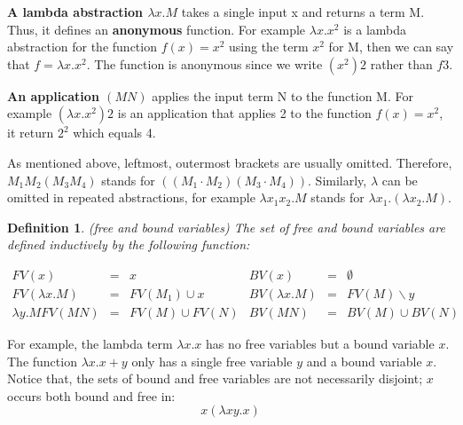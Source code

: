 \documentclass[a4paper,11pt,twoside]{report}
\newtheorem{def1}{\textbf{Definition}}[chapter]
\begin{document}
\textbf{A lambda abstraction $\lambda x.M$} takes a single input x and returns a term M. Thus, it defines an \textbf{anonymous} function. For example $\lambda x.x^2$ is a lambda abstraction for the function $f(x) = x^2$ using the term $x^2$ for M, then we can say that $f = \lambda x.x^2$. The function is anonymous since we write $(x^2)2$ rather than $f3$.

\textbf{An application $(MN)$} applies the input term N to the function M. For example $(\lambda x.x^2)2$ is an application that applies 2 to the function $f(x) = x^2$, it return $2^2$ which equals 4.

As mentioned above, leftmost, outermost brackets are usually omitted. Therefore, $M_1M_2(M_3M_4)$ stands for $((M_1\cdot M_2)(M_3\cdot M_4))$. Similarly, $\lambda$ can be omitted in repeated abstractions, for example $\lambda x_1x_2.M$ stands for $\lambda x_1.(\lambda x_2.M)$.

\begin{def1}
\normalfont (free and bound variables) The set of free and bound variables are defined inductively by the following function:
\end{def1}

\begin{equation*}
\begin{array}{lcllcl}
FV(x)           & = & {x}             & BV(x)           &=& \emptyset\\
FV(\lambda x.M) & = & FV(M_1)\cup {x} & BV(\lambda x.M) &=& FV(M)\backslash y\\  \lambda y.M
FV(MN)          & = & FV(M)\cup FV(N) & BV(MN)          &=& BV(M) \cup BV(N)
\end{array}
\end{equation*}


For example, the lambda term $\lambda x.x$ has no free variables but a bound variable $x$. The function $\lambda x.x+y$ only has a single free variable $y$ and a bound variable $x$. 
Notice that, the sets of bound and free variables are not necessarily disjoint; $x$ occurs both bound and free in:
\begin{equation*}
x(\lambda xy.x)
\end{equation*}
\end{document}

